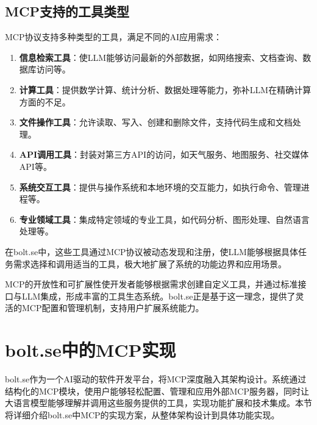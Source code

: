 \subsection{MCP支持的工具类型}

MCP协议支持多种类型的工具，满足不同的AI应用需求：

\begin{enumerate}
  \item \textbf{信息检索工具}：使LLM能够访问最新的外部数据，如网络搜索、文档查询、数据库访问等。
  
  \item \textbf{计算工具}：提供数学计算、统计分析、数据处理等能力，弥补LLM在精确计算方面的不足。
  
  \item \textbf{文件操作工具}：允许读取、写入、创建和删除文件，支持代码生成和文档处理。
  
  \item \textbf{API调用工具}：封装对第三方API的访问，如天气服务、地图服务、社交媒体API等。
  
  \item \textbf{系统交互工具}：提供与操作系统和本地环境的交互能力，如执行命令、管理进程等。
  
  \item \textbf{专业领域工具}：集成特定领域的专业工具，如代码分析、图形处理、自然语言处理等。
\end{enumerate}

在bolt.se中，这些工具通过MCP协议被动态发现和注册，使LLM能够根据具体任务需求选择和调用适当的工具，极大地扩展了系统的功能边界和应用场景。

MCP的开放性和可扩展性使开发者能够根据需求创建自定义工具，并通过标准接口与LLM集成，形成丰富的工具生态系统。bolt.se正是基于这一理念，提供了灵活的MCP配置和管理机制，支持用户扩展系统能力。

\section{bolt.se中的MCP实现}

bolt.se作为一个AI驱动的软件开发平台，将MCP深度融入其架构设计。系统通过结构化的MCP模块，使用户能够轻松配置、管理和应用外部MCP服务器，同时让大语言模型能够理解并调用这些服务提供的工具，实现功能扩展和技术集成。本节将详细介绍bolt.se中MCP的实现方案，从整体架构设计到具体功能实现。

